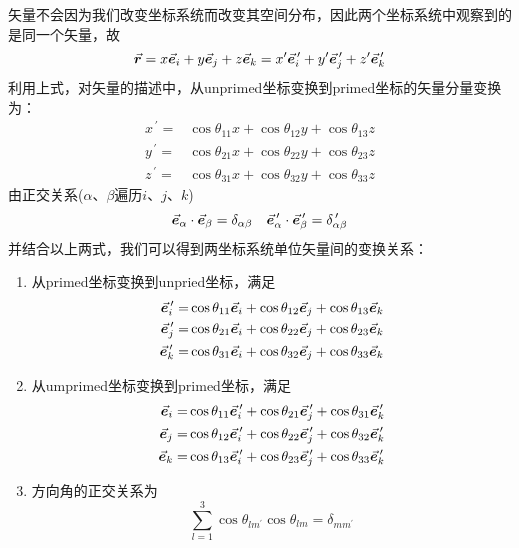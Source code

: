 矢量不会因为我们改变坐标系统而改变其空间分布，因此两个坐标系统中观察到的是同一个矢量，故
\begin{equation}
	\vec{\bm{r}} = x \vec{\bm{e}}_{i} + y \vec{\bm{e}}_{j} + z \vec{\bm{e}}_{k}
	     = x^{\prime} \vec{\bm{e}}_{i}^{\,\prime} + y^{\prime} \vec{\bm{e}}_{j}^{\,\prime} + z^{\prime} \vec{\bm{e}}_{k}^{\,\prime}
\end{equation}
利用上式，对矢量的描述中，从unprimed坐标变换到primed坐标的矢量分量变换为：
\begin{equation}
	\begin{aligned}
		x^{\,\prime} =& \cos{\theta_{11}} x + \cos{\theta_{12}} y + \cos{\theta_{13}} z \\
		y^{\,\prime} =& \cos{\theta_{21}} x + \cos{\theta_{22}} y + \cos{\theta_{23}} z \\
		z^{\,\prime} =& \cos{\theta_{31}} x + \cos{\theta_{32}} y + \cos{\theta_{33}} z
	\end{aligned}
\end{equation}
由正交关系($\alpha$、$\beta$遍历$i$、$j$、$k$)
\begin{equation}
	\vec{\bm{e}}_{\alpha} \cdot \vec{\bm{e}}_{\beta} = \delta_{\alpha\beta}
	\quad
	\vec{\bm{e}}_{\alpha}^{\,\prime} \cdot \vec{\bm{e}}_{\beta}^{\,\prime} = \delta_{\alpha\beta}^{\,\prime}
\end{equation}
并结合以上两式，我们可以得到两坐标系统单位矢量间的变换关系：
\begin{enumerate}
	\item 从primed坐标变换到unpried坐标，满足
		\begin{equation}
			\begin{aligned}
				\vec{\bm{e}}_{i}^{\,\prime} =& \cos{\theta_{11}} \vec{\bm{e}}_{i} + \cos{\theta_{12}} \vec{\bm{e}}_{j} + \cos{\theta_{13}} \vec{\bm{e}}_{k} \\
				\vec{\bm{e}}_{j}^{\,\prime} =& \cos{\theta_{21}} \vec{\bm{e}}_{i} + \cos{\theta_{22}} \vec{\bm{e}}_{j} + \cos{\theta_{23}} \vec{\bm{e}}_{k} \\
				\vec{\bm{e}}_{k}^{\,\prime} =& \cos{\theta_{31}} \vec{\bm{e}}_{i} + \cos{\theta_{32}} \vec{\bm{e}}_{j} + \cos{\theta_{33}} \vec{\bm{e}}_{k}
			\end{aligned}
		\end{equation}
	\item 从umprimed坐标变换到primed坐标，满足
	\begin{equation}
		\begin{aligned}
			\vec{\bm{e}}_{i} =& \cos{\theta_{11}} \vec{\bm{e}}_{i}^{\,\prime} + \cos{\theta_{21}} \vec{\bm{e}}_{j}^{\,\prime} + \cos{\theta_{31}} \vec{\bm{e}}_{k}^{\,\prime} \\
			\vec{\bm{e}}_{j} =& \cos{\theta_{12}} \vec{\bm{e}}_{i}^{\,\prime} + \cos{\theta_{22}} \vec{\bm{e}}_{j}^{\,\prime} + \cos{\theta_{32}} \vec{\bm{e}}_{k}^{\,\prime} \\
			\vec{\bm{e}}_{k} =& \cos{\theta_{13}} \vec{\bm{e}}_{i}^{\,\prime} + \cos{\theta_{23}} \vec{\bm{e}}_{j}^{\,\prime} + \cos{\theta_{33}} \vec{\bm{e}}_{k}^{\,\prime}
		\end{aligned}
	\end{equation}
	\item 方向角的正交关系为
		\begin{equation}
			\sum_{l = 1}^{3} \cos{\theta}_{lm^{\prime}} \cos{\theta}_{lm} = \delta_{mm^{\prime}}
		\end{equation}
\end{enumerate}

